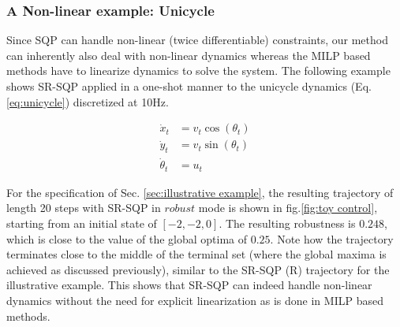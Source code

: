 \subsubsection{A Non-linear example: Unicycle}
Since SQP can handle non-linear (twice differentiable) constraints, our method can inherently also deal with non-linear dynamics whereas the MILP based methods have to linearize dynamics to solve the system. The following example shows SR-SQP applied in a one-shot manner to the unicycle dynamics (Eq. \ref{eq:unicycle}) discretized at 10Hz.

\begin{subequations}
\label{eq:unicycle}
\begin{align}
\dot{x}_t &=v_t \cos (\theta_t) \nonumber \\ 
\dot{y}_t &=v_t \sin (\theta_t) \nonumber \\
\dot{\theta}_t &= u_t
\end{align}
\end{subequations}

For the specification of Sec. \ref{sec:illustrative example}, the resulting trajectory of length 20 steps with SR-SQP in $\textit{robust}$ mode is shown in fig.\ref{fig:toy control}, starting from an initial state of $[-2,-2,0]$. The resulting robustness is $0.248$, which is close to the value of the global optima of $0.25$. Note how the trajectory terminates close to the middle of the terminal set (where the global maxima is achieved as discussed previously), similar to the SR-SQP (R) trajectory for the illustrative example. This shows that SR-SQP can indeed handle non-linear dynamics without the need for explicit linearization as is done in MILP based methods.
